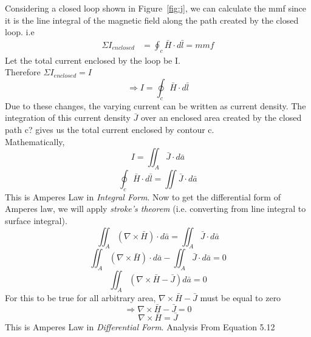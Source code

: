 Considering a closed loop shown in Figure~\ref{fig:j}, we can calculate the mmf since it is the line integral of the magnetic field along the path created by the closed loop. i.e
\begin{align*}
\Sigma I_{enclosed} &= \oint_c\bar{H}\cdot d\bar{l} = mmf
\end{align*}
Let the total current enclosed by the loop be I.\\
Therefore $\Sigma I_{enclosed} = I$
\begin{equation*}
\Rightarrow I = \oint_c\bar{H}\cdot d\bar{l}
\end{equation*}
Due to these changes, the varying current can be written as current density. The integration of this current density $\bar{J}$ over an enclosed area created by the closed path c? gives us the total current enclosed by contour c.\\
Mathematically,
\begin{equation*}
I = \iint_A\bar{J} \cdot d\bar{a}
\end{equation*}
\begin{equation}
\boxed{\oint_c\bar{H} \cdot d\bar{l} = \iint\bar{J} \cdot d\bar{a}}
\end{equation}
This is Amperes Law in \emph{Integral Form}. Now to get the differential form of Amperes law, we will apply \emph{stroke's theorem} (i.e. converting from line integral to surface integral).
\begin{equation*}
\iint_A(\nabla \times \bar{H}) \cdot d\bar{a} = \iint_A\bar{J} \cdot d\bar{a}
\end{equation*}
\begin{equation*}
\iint_A(\nabla \times \bar{H}) \cdot d\bar{a} - \iint_A\bar{J} \cdot d\bar{a} = 0
\end{equation*}
\begin{equation*}
\iint_A(\nabla \times \bar{H} - \bar{J})d\bar{a} = 0
\end{equation*} 
For this to be true for all arbitrary area, $\nabla \times \bar{H} - \bar{J}$ must be equal to zero
\begin{equation*}
\Rightarrow \nabla \times \bar{H} - \bar{J} = 0
\end{equation*}
\begin{equation}
\boxed{\nabla \times \bar{H} = \bar{J}}
\end{equation}
This is Amperes Law in \emph{Differential Form}. Analysis From Equation 5.12
